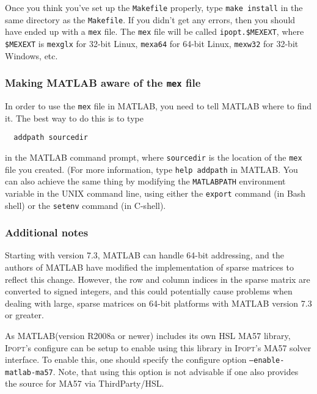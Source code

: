 \documentclass[10pt]{article}
\newcommand{\Ipopt}{\textsc{Ipopt}\xspace}
\newcommand{\Matlab}{\textsc{MATLAB}\xspace}
\begin{document}
Once you think you've set up the {\tt Makefile} properly, type
{\tt make install} in the same directory as the {\tt Makefile}. If you didn't 
get any errors, then you should have ended up with a {\tt mex} file. The {\tt mex}
file will be called {\tt ipopt.\$MEXEXT}, where {\tt \$MEXEXT} is {\tt mexglx}
for 32-bit Linux, {\tt mexa64} for 64-bit Linux, {\tt mexw32} for 32-bit Windows, etc.

\subsubsection{Making \Matlab aware of the {\tt mex} file} 

In order to use the {\tt mex} file in \Matlab, you need to tell \Matlab where 
to find it. The best way to do this is to type
\begin{verbatim}
  addpath sourcedir
\end{verbatim}
in the \Matlab command prompt, where {\tt sourcedir} is the location of the 
{\tt mex} file you created. (For more information, type {\tt help addpath} in 
\Matlab. You can also achieve the same thing by modifying the {\tt MATLABPATH} 
environment variable in the UNIX command line, using either the {\tt export} 
command (in Bash shell) or the {\tt setenv} command (in C-shell).



\subsubsection{Additional notes}

Starting with version 7.3, \Matlab can handle 64-bit 
addressing, and the authors of \Matlab have modified the implementation of 
sparse matrices to reflect this change. However, the row and column indices in 
the sparse matrix are converted to signed integers, and this could potentially 
cause problems when dealing with large, sparse matrices on 64-bit platforms 
with \Matlab version 7.3 or greater.

As \Matlab (version R2008a or newer) includes its own HSL MA57
library, \Ipopt's configure can be setup to enable using this library in
\Ipopt's MA57 solver interface. To enable this, one should specify the
configure option {\tt --enable-matlab-ma57}. Note, that using this option is
not advisable if one also provides the source for MA57 via ThirdParty/HSL.
\end{document}
